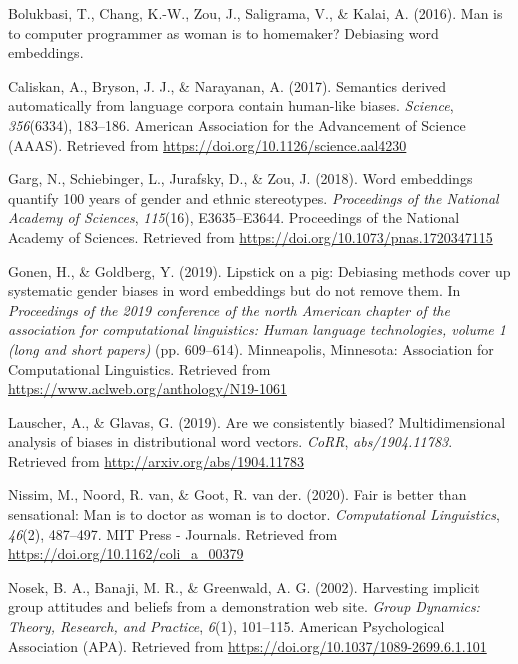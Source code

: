 \documentclass[10pt,dvipsnames,enabledeprecatedfontcommands]{scrartcl}
\begin{document}
\hypertarget{refs}{}
\hypertarget{ref-bolukbasi2016man}{}
Bolukbasi, T., Chang, K.-W., Zou, J., Saligrama, V., \& Kalai, A.
(2016). Man is to computer programmer as woman is to homemaker?
Debiasing word embeddings.

\hypertarget{ref-Caliskan2017semanticsBiases}{}
Caliskan, A., Bryson, J. J., \& Narayanan, A. (2017). Semantics derived
automatically from language corpora contain human-like biases.
\emph{Science}, \emph{356}(6334), 183--186. American Association for the
Advancement of Science (AAAS). Retrieved from
\url{https://doi.org/10.1126/science.aal4230}

\hypertarget{ref-Garg2018years}{}
Garg, N., Schiebinger, L., Jurafsky, D., \& Zou, J. (2018). Word
embeddings quantify 100 years of gender and ethnic stereotypes.
\emph{Proceedings of the National Academy of Sciences}, \emph{115}(16),
E3635--E3644. Proceedings of the National Academy of Sciences. Retrieved
from \url{https://doi.org/10.1073/pnas.1720347115}

\hypertarget{ref-Gonen2019lipstick}{}
Gonen, H., \& Goldberg, Y. (2019). Lipstick on a pig: Debiasing methods
cover up systematic gender biases in word embeddings but do not remove
them. In \emph{Proceedings of the 2019 conference of the north American
chapter of the association for computational linguistics: Human language
technologies, volume 1 (long and short papers)} (pp. 609--614).
Minneapolis, Minnesota: Association for Computational Linguistics.
Retrieved from \url{https://www.aclweb.org/anthology/N19-1061}

\hypertarget{ref-Lauscher2019multidimensional}{}
Lauscher, A., \& Glavas, G. (2019). Are we consistently biased?
Multidimensional analysis of biases in distributional word vectors.
\emph{CoRR}, \emph{abs/1904.11783}. Retrieved from
\url{http://arxiv.org/abs/1904.11783}

\hypertarget{ref-Nissim2020fair}{}
Nissim, M., Noord, R. van, \& Goot, R. van der. (2020). Fair is better
than sensational: Man is to doctor as woman is to doctor.
\emph{Computational Linguistics}, \emph{46}(2), 487--497. MIT Press -
Journals. Retrieved from \url{https://doi.org/10.1162/coli_a_00379}

\hypertarget{ref-Nosek2002harvesting}{}
Nosek, B. A., Banaji, M. R., \& Greenwald, A. G. (2002). Harvesting
implicit group attitudes and beliefs from a demonstration web site.
\emph{Group Dynamics: Theory, Research, and Practice}, \emph{6}(1),
101--115. American Psychological Association (APA). Retrieved from
\url{https://doi.org/10.1037/1089-2699.6.1.101}
\end{document}
